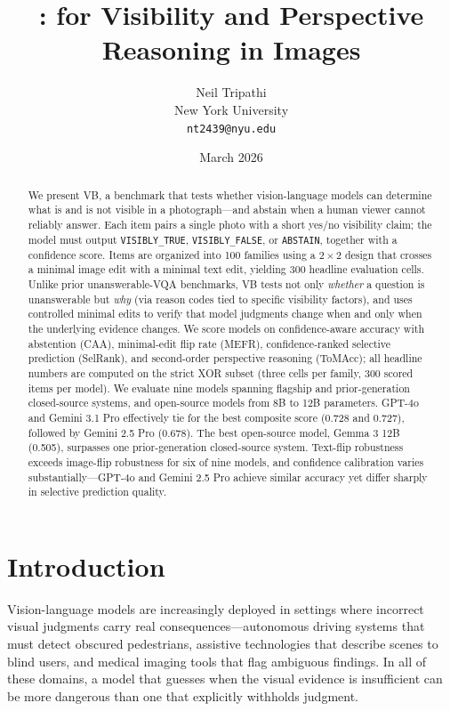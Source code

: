 \documentclass[11pt]{article}
\title{\benchmarkname: \benchlong{} for Visibility and Perspective Reasoning in Images}
\author{
  Neil Tripathi\\
  New York University\\
  \texttt{nt2439@nyu.edu}
}
\date{March 2026}
\newcommand{\benchmarkname}{\textsc{VB}}
\begin{document}
\maketitle

\begin{abstract}
We present \benchmarkname, a benchmark that tests whether vision-language models can determine what is and is not visible in a photograph---and abstain when a human viewer cannot reliably answer. Each item pairs a single photo with a short yes/no visibility claim; the model must output \texttt{VISIBLY\_TRUE}, \texttt{VISIBLY\_FALSE}, or \texttt{ABSTAIN}, together with a confidence score. Items are organized into 100 families using a \(2 \times 2\) design that crosses a minimal image edit with a minimal text edit, yielding 300 headline evaluation cells. Unlike prior unanswerable-VQA benchmarks, \benchmarkname{} tests not only \emph{whether} a question is unanswerable but \emph{why} (via reason codes tied to specific visibility factors), and uses controlled minimal edits to verify that model judgments change when and only when the underlying evidence changes. We score models on confidence-aware accuracy with abstention (CAA), minimal-edit flip rate (MEFR), confidence-ranked selective prediction (SelRank), and second-order perspective reasoning (ToMAcc); all headline numbers are computed on the strict XOR subset (three cells per family, 300 scored items per model). We evaluate nine models spanning flagship and prior-generation closed-source systems, and open-source models from 8B to 12B parameters. GPT-4o and Gemini 3.1 Pro effectively tie for the best composite score (0.728 and 0.727), followed by Gemini 2.5 Pro (0.678). The best open-source model, Gemma 3 12B (0.505), surpasses one prior-generation closed-source system. Text-flip robustness exceeds image-flip robustness for six of nine models, and confidence calibration varies substantially---GPT-4o and Gemini 2.5 Pro achieve similar accuracy yet differ sharply in selective prediction quality.
\end{abstract}

\section{Introduction}

Vision-language models are increasingly deployed in settings where incorrect visual judgments carry real consequences---autonomous driving systems that must detect obscured pedestrians, assistive technologies that describe scenes to blind users, and medical imaging tools that flag ambiguous findings. In all of these domains, a model that guesses when the visual evidence is insufficient can be more dangerous than one that explicitly withholds judgment.
\end{document}

